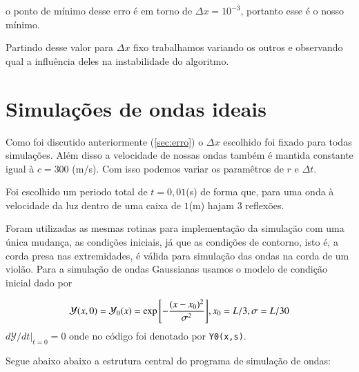\documentclass[a4paper, 11pt]{article}
\begin{document}
o ponto de mínimo desse erro é em torno de \( \Delta x = 10^{-3} \), portanto esse é o nosso mínimo.

Partindo desse valor para \( \Delta x\) fixo trabalhamos variando os outros e observando qual a
influência deles na instabilidade do algoritmo.

\section{Simulações de ondas ideais}


Como foi discutido anteriormente (\ref{sec:erro}) o $\Delta x$ escolhido
foi fixado para todas simulações. Além disso a velocidade de nossas ondas também é mantida constante
igual à \( c = 300\) (m/s). Com isso podemos variar os paramêtros de \( r \) e \( \Delta t \). 

Foi escolhido um periodo total de \( t = 0,01\)(s)  de forma que, para uma onda à velocidade da luz
dentro de uma caixa de \( 1\)(m) hajam 3 reflexões.


Foram utilizadas as mesmas rotinas para implementação da simulação com uma única mudança, as
condições iniciais, já que as condições de contorno, isto é, a corda presa nas extremidades, é
válida para simulação das ondas na corda de um violão. Para a simulação de ondas Gaussianas usamos o
modelo de condição inicial dado por 

\begin{equation}
    \mathcal{Y}(x, 0) = \mathcal{Y}_0 (x) = \exp{\left[- \frac{(x-x_0)^2}{\sigma^2}\right]}, x_0 = L/3, \sigma = L/30 \\
  \label{eq:y_0}
\end{equation}
\( d \mathcal{Y} / d t |_{t = 0} = 0 \)
onde no código foi denotado por  \verb|Y0(x,s)|.


Segue abaixo abaixo a estrutura central do programa de simulação de ondas:
\end{document}
